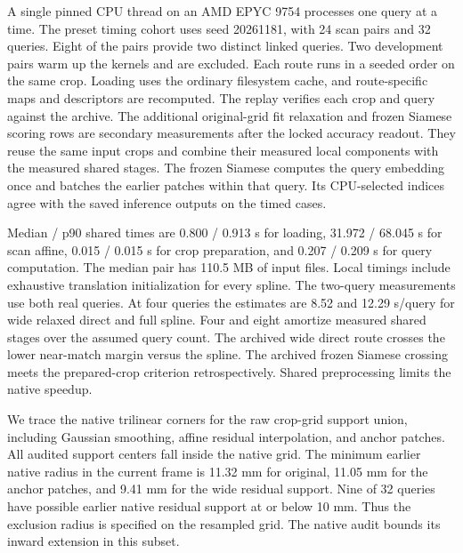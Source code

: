 A single pinned CPU thread on an AMD EPYC 9754 processes one query at a time. The preset timing cohort uses seed 20261181, with 24 scan pairs and 32 queries. Eight of the pairs provide two distinct linked queries. Two development pairs warm up the kernels and are excluded. Each route runs in a seeded order on the same crop. Loading uses the ordinary filesystem cache, and route-specific maps and descriptors are recomputed. The replay verifies each crop and query against the archive. The additional original-grid fit relaxation and frozen Siamese scoring rows are secondary measurements after the locked accuracy readout. They reuse the same input crops and combine their measured local components with the measured shared stages. The frozen Siamese computes the query embedding once and batches the earlier patches within that query. Its CPU-selected indices agree with the saved inference outputs on the timed cases.

Median / p90 shared times are 0.800 / 0.913 s for loading, 31.972 / 68.045 s for scan affine, 0.015 / 0.015 s for crop preparation, and 0.207 / 0.209 s for query computation. The median pair has 110.5 MB of input files. Local timings include exhaustive translation initialization for every spline. The two-query measurements use both real queries. At four queries the estimates are 8.52 and 12.29 s/query for wide relaxed direct and full spline. Four and eight amortize measured shared stages over the assumed query count. The archived wide direct route crosses the lower near-match margin versus the spline. The archived frozen Siamese crossing meets the prepared-crop criterion retrospectively. Shared preprocessing limits the native speedup.

We trace the native trilinear corners for the raw crop-grid support union, including Gaussian smoothing, affine residual interpolation, and anchor patches. All audited support centers fall inside the native grid. The minimum earlier native radius in the current frame is 11.32 mm for original, 11.05 mm for the anchor patches, and 9.41 mm for the wide residual support. Nine of 32 queries have possible earlier native residual support at or below 10 mm. Thus the exclusion radius is specified on the resampled grid. The native audit bounds its inward extension in this subset.
